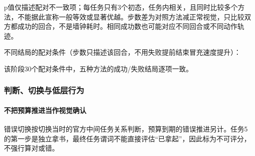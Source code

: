 p值仅描述配对不一致项；每任务只有3个初态，任务内相关，且同时比较多个方法，不能据此宣称一般等效或显著优越。步数差为对照方法减正常视觉，只比较双方都成功的回合，不是墙钟耗时。相同成功数也可能对应不同回合或不同动作轨迹。

不同结局的配对条件（步数只描述该回合，不用失败提前结束冒充速度提升）：

该阶段30个配对条件中，五种方法的成功/失败结局逐项一致。

\subsubsection{判断、切换与低层行为}\label{s12-detail-11}

\paragraph{不把预算推进当作视觉确认}\label{s12-detail-12}

错误切换按切换当时的官方中间任务关系判断，预算到期的错误推进另计。任务5的第一步是独立拿书，最终任务谓词不能直接评估``已拿起''，因此标为不可评分，不强行算对或错。

